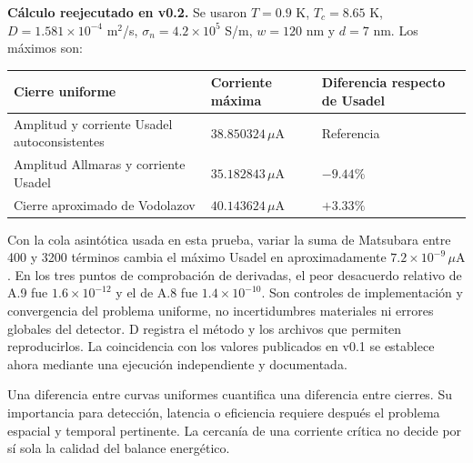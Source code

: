 \documentclass[
  spanish,
  10pt,
  a4paper,
]{article}
\newcounter{none} %
\begin{document}
\textbf{Cálculo reejecutado en v0.2.} Se usaron \(T=0.9\) K,
\(T_c=8.65\) K, \(D=1.581\times10^{-4}\) m\(^2\)/s,
\(\sigma_n=4.2\times10^5\) S/m, \(w=120\) nm y \(d=7\) nm. Los máximos
son:

{\def\LTcaptype{none} %
\begin{longtable}[]{@{}
  >{\raggedright\arraybackslash}p{}
  >{\raggedleft\arraybackslash}p{}
  >{\raggedleft\arraybackslash}p{}@{}}
\toprule\noalign{}
\begin{minipage}[b]{\linewidth}\raggedright
Cierre uniforme
\end{minipage} & \begin{minipage}[b]{\linewidth}\raggedleft
Corriente máxima
\end{minipage} & \begin{minipage}[b]{\linewidth}\raggedleft
Diferencia respecto de Usadel
\end{minipage} \\
\midrule\noalign{}
\endhead
\bottomrule\noalign{}
\endlastfoot
Amplitud y corriente Usadel autoconsistentes &
\(38.850324\,\mu\mathrm A\) & Referencia \\
Amplitud Allmaras y corriente Usadel & \(35.182843\,\mu\mathrm A\) &
\(-9.44\%\) \\
Cierre aproximado de Vodolazov & \(40.143624\,\mu\mathrm A\) &
\(+3.33\%\) \\
\end{longtable}
}

Con la cola asintótica usada en esta prueba, variar la suma de Matsubara
entre 400 y 3200 términos cambia el máximo Usadel en aproximadamente
\(7.2\times10^{-9}\,\mu\mathrm A\). En los tres puntos de comprobación
de derivadas, el peor desacuerdo relativo de A.9 fue
\(1.6\times10^{-12}\) y el de A.8 fue \(1.4\times10^{-10}\). Son
controles de implementación y convergencia del problema uniforme, no
incertidumbres materiales ni errores globales del detector. D registra
el método y los archivos que permiten reproducirlos. La coincidencia con
los valores publicados en v0.1 se establece ahora mediante una ejecución
independiente y documentada.

Una diferencia entre curvas uniformes cuantifica una diferencia entre
cierres. Su importancia para detección, latencia o eficiencia requiere
después el problema espacial y temporal pertinente. La cercanía de una
corriente crítica no decide por sí sola la calidad del balance
energético.
\end{document}
